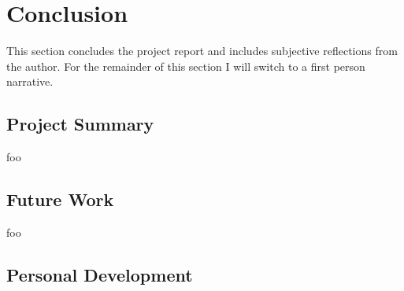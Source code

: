 
\section{Conclusion}

This section concludes the project report and includes subjective reflections from the author. For the remainder of this section I will switch to a first person narrative.


\subsection{Project Summary}


foo


\subsection{Future Work}








foo


\subsection{Personal Development}

